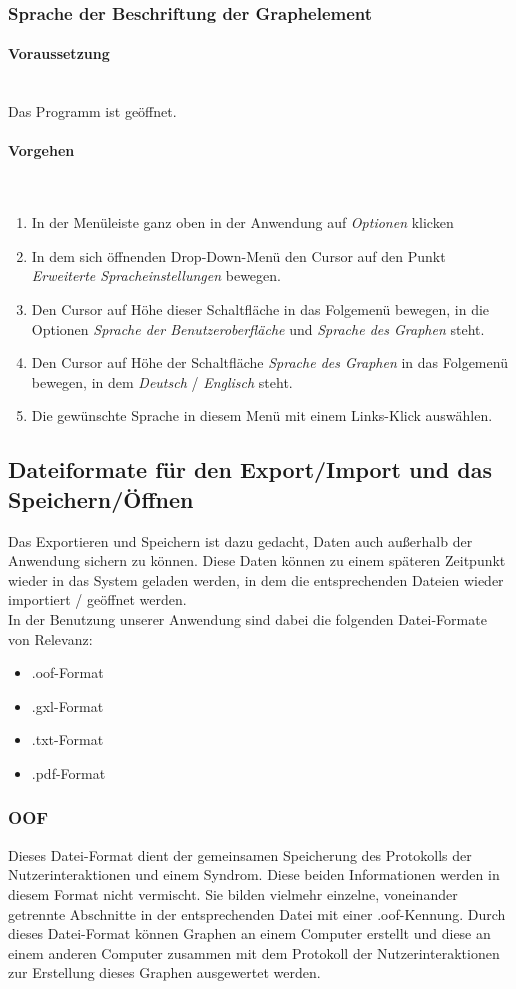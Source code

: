 \documentclass[enabledeprecatedfontcommands,fontsize=11pt,paper=a4,twoside]{scrartcl}
\newcounter{one}
\newcommand*{\condition}{\paragraph{Voraussetzung}$\;$ \vspace{0.2cm}\\}
\newcommand*{\actions}{\paragraph{Vorgehen} $\;$\vspace{0.2cm}\\}
\begin{document}
			\newpage
		\subsubsection{Sprache der Beschriftung der Graphelement}
		\condition 	
		Das Programm ist geöffnet.
		\actions
		\begin{enumerate}
				\item In der Menüleiste ganz oben in der Anwendung auf \textit{Optionen} klicken 
				\item In dem sich öffnenden Drop-Down-Menü den Cursor auf den Punkt \textit{Erweiterte Spracheinstellungen} bewegen.
				\item Den Cursor auf Höhe dieser Schaltfläche in das Folgemenü bewegen, in die Optionen \textit{Sprache der Benutzeroberfläche} und \textit{Sprache des Graphen} steht.
				\item Den Cursor auf Höhe der Schaltfläche \textit{Sprache des Graphen} in das Folgemenü bewegen, in dem \textit{Deutsch} / \textit{Englisch} steht.
				\item Die gewünschte Sprache in diesem Menü mit einem Links-Klick auswählen.
		\end{enumerate}
	 	
		
				\newpage
	\subsection{Dateiformate für den Export/Import und das Speichern/Öffnen} 
Das Exportieren und Speichern ist dazu gedacht, Daten auch außerhalb der Anwendung sichern zu können. Diese Daten können zu einem späteren Zeitpunkt wieder in das System geladen werden, in dem die entsprechenden Dateien wieder importiert / geöffnet werden.\\
In der Benutzung unserer Anwendung sind dabei die folgenden Datei-Formate von Relevanz: 
\begin{itemize}
\item .oof-Format
\item .gxl-Format
\item .txt-Format
\item .pdf-Format
\end{itemize}

	\subsubsection{OOF}
	Dieses Datei-Format dient der gemeinsamen Speicherung des Protokolls der Nutzerinteraktionen und einem Syndrom. Diese beiden Informationen werden in diesem Format nicht vermischt. Sie bilden vielmehr einzelne, voneinander getrennte Abschnitte in der entsprechenden Datei mit einer .oof-Kennung. Durch dieses Datei-Format können Graphen an einem Computer erstellt und diese an einem anderen Computer zusammen mit dem Protokoll der Nutzerinteraktionen zur Erstellung dieses Graphen ausgewertet werden.
	
\end{document}
